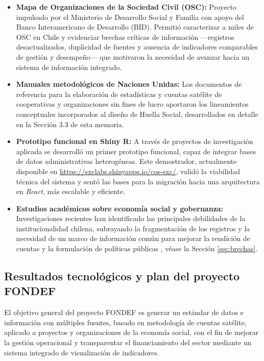 \begin{itemize}
    \item \textbf{Mapa de Organizaciones de la Sociedad Civil (OSC):}
    Proyecto impulsado por el Ministerio de Desarrollo Social y Familia con apoyo del Banco
    Interamericano de Desarrollo (BID). Permitió caracterizar a miles de OSC en Chile y
    evidenciar brechas críticas de información —registros desactualizados, duplicidad de fuentes
    y ausencia de indicadores comparables de gestión y desempeño— que motivaron la necesidad
    de avanzar hacia un sistema de información integrado.
 
    \item \textbf{Manuales metodológicos de Naciones Unidas:}
    Los documentos de referencia para la elaboración de estadísticas y cuentas satélite de
    cooperativas y organizaciones sin fines de lucro aportaron los lineamientos conceptuales
    incorporados al diseño de Huella Social, desarrollados en detalle en la Sección 3.3 de esta memoria.
    
 
    \item \textbf{Prototipo funcional en Shiny R:}
    A través de proyectos de investigación aplicada se desarrolló un primer prototipo funcional,
    capaz de integrar bases de datos administrativas heterogéneas. Este demostrador, actualmente
    disponible en \url{https://sxclabs.shinyapps.io/cos-sxc/}, validó la viabilidad técnica del
    sistema y sentó las bases para la migración hacia una arquitectura en \textit{React}, más
    escalable y eficiente.
 
    \item \textbf{Estudios académicos sobre economía social y gobernanza:}
    Investigaciones recientes han identificado las principales debilidades de la institucionalidad
    chilena, subrayando la fragmentación de los registros y la necesidad de un marco de
    información común para mejorar la rendición de cuentas y la formulación de políticas
    públicas , véase la Sección \ref{sec:brechas}.

    
\end{itemize}
 
\subsection{Resultados tecnológicos y plan del proyecto FONDEF}
\label{anx:resultados tecnologicos}
El objetivo general del proyecto FONDEF es generar un estándar de datos e información con
múltiples fuentes, basado en metodología de cuentas satélite, aplicado a proyectos y organizaciones
de la economía social, con el fin de mejorar la gestión operacional y transparentar el financiamiento
del sector mediante un sistema integrado de visualización de indicadores.
 
